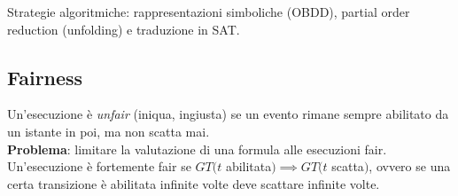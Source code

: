 Strategie algoritmiche: rappresentazioni simboliche (OBDD), partial order reduction (unfolding) e traduzione in SAT.


\subsection{Fairness}
Un’esecuzione è \textit{unfair} (iniqua, ingiusta) se un evento rimane sempre abilitato da un istante in poi, ma non scatta mai.\\
\textbf{Problema}: limitare la valutazione di una formula alle esecuzioni fair.\\
Un’esecuzione è fortemente fair se $GT(t$ abilitata$) \implies GT(t$ scatta$)$, ovvero se una certa transizione è abilitata infinite volte deve scattare infinite volte.